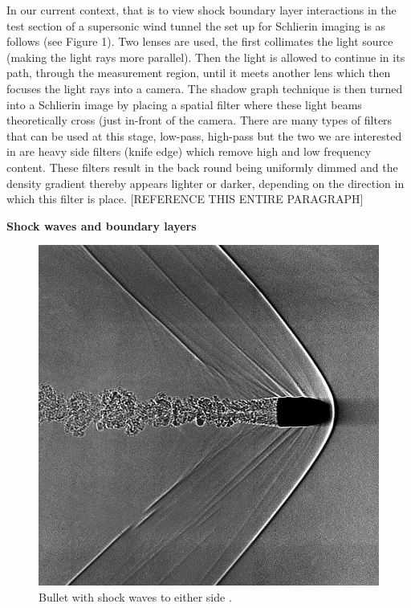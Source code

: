 \documentclass[a4paper,10pt,twoside]{article}
\begin{document}
\begin{multicols}{2}
In our current context, that is to view shock boundary layer interactions in the test section of a supersonic wind tunnel the set up for Schlierin imaging is as follows (see Figure 1). Two lenses are used, the first collimates the light source (making the light rays more parallel). Then the light is allowed to continue in its path, through the measurement region, until it meets another lens which then focuses the light rays into a camera. The shadow graph technique is then turned into a Schlierin image by placing a spatial filter where these light beams theoretically cross (just in-front of the camera. There are many types of filters that can be used at this stage, low-pass, high-pass but the two we are interested in are heavy side filters (knife edge) which remove high and low frequency content. These filters result in the back round being uniformly dimmed and the density gradient thereby appears lighter or darker, depending on the direction in which this filter is place. [REFERENCE THIS ENTIRE PARAGRAPH]



\vspace{5mm}
\centerline{\textbf{Shock waves and boundary layers}}
\vspace{5mm}



\begin{figure}[H]
    \centering
    \includegraphics[width=\linewidth]{bulletshock.jpg}
    \caption{Bullet with shock waves to either side \cite{4}.}
    \label{fig:my_label}
\end{figure}




\end{multicols}
\end{document}
